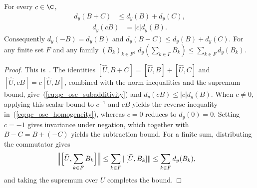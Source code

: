 \begin{lemma}
    \label{thm:qc_site_oscillation_seminorm}
    \leanok
    For every $c\in\C$,
    \begin{align}
        d_y(B+C) & \le d_y(B)+d_y(C),
        \label{eq:qc_osc_subadditivity}
    \end{align}
    \begin{align}
        d_y(cB) & =|c|d_y(B).
        \label{eq:qc_osc_homogeneity}
    \end{align}
    Consequently $d_y(-B)=d_y(B)$ and
    $d_y(B-C)\le d_y(B)+d_y(C)$.
    For any finite set $F$ and any family $(B_k)_{k\in F}$,
    $d_y(\sum_{k\in F}B_k)\le\sum_{k\in F}d_y(B_k)$.
\end{lemma}
\begin{proof}
    \leanok
    This is~\cite[``Subadditivity and absolute
        homogeneity'']{QICLean2026Blueprint}.
    The identities
    $[\widehat U,B+C]=[\widehat U,B]+[\widehat U,C]$ and
    $[\widehat U,cB]=c[\widehat U,B]$, combined with the norm inequalities
    and the supremum bound, give~(\ref{eq:qc_osc_subadditivity}) and
    $d_y(cB)\le|c|d_y(B)$.
    When $c\ne0$, applying this scalar bound to $c^{-1}$ and $cB$ yields
    the reverse inequality in~(\ref{eq:qc_osc_homogeneity}), whereas $c=0$
    reduces to $d_y(0)=0$.
    Setting $c=-1$ gives invariance under negation, which together with
    $B-C=B+(-C)$ yields the subtraction bound.
    For a finite sum, distributing the commutator gives
    \begin{align}
        \Bigl\|\Bigl[\widehat U,\sum_{k\in F}B_k\Bigr]\Bigr\|
         & \le\sum_{k\in F}\|[\widehat U,B_k]\|
        \le\sum_{k\in F}d_y(B_k),
    \end{align}
    and taking the supremum over $U$ completes the bound.
\end{proof}

